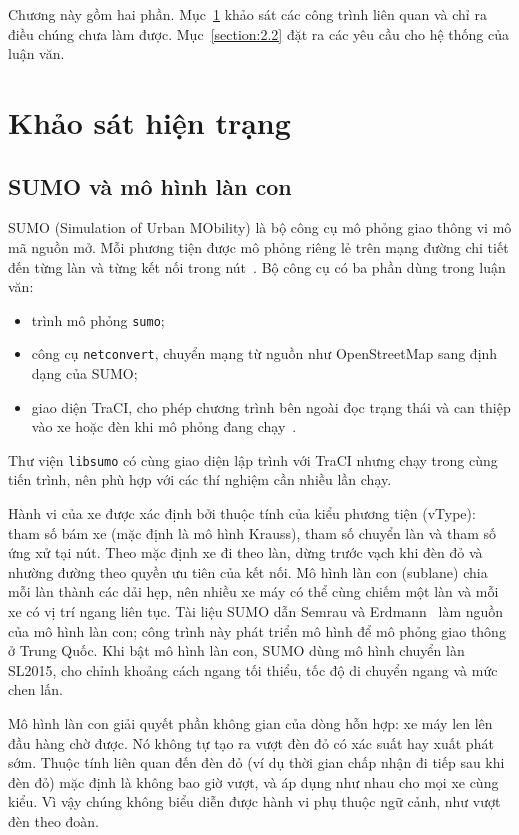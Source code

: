 \documentclass[../DoAn.tex]{subfiles}
\begin{document}
Chương này gồm hai phần. Mục~\ref{section:2.1} khảo sát các công trình liên quan và chỉ ra điều chúng chưa làm được. Mục~\ref{section:2.2} đặt ra các yêu cầu cho hệ thống của luận văn.

\section{Khảo sát hiện trạng}
\label{section:2.1}

\subsection{SUMO và mô hình làn con}
\label{subsection:2.1.1}

SUMO (Simulation of Urban MObility) là bộ công cụ mô phỏng giao thông vi mô mã nguồn mở. Mỗi phương tiện được mô phỏng riêng lẻ trên mạng đường chi tiết đến từng làn và từng kết nối trong nút~\cite{lopez2018sumo}. Bộ công cụ có ba phần dùng trong luận văn:
\begin{itemize}
    \item trình mô phỏng \texttt{sumo};
    \item công cụ \texttt{netconvert}, chuyển mạng từ nguồn như OpenStreetMap sang định dạng của SUMO;
    \item giao diện TraCI, cho phép chương trình bên ngoài đọc trạng thái và can thiệp vào xe hoặc đèn khi mô phỏng đang chạy~\cite{lopez2018sumo}.
\end{itemize}
Thư viện \texttt{libsumo} có cùng giao diện lập trình với TraCI nhưng chạy trong cùng tiến trình, nên phù hợp với các thí nghiệm cần nhiều lần chạy.

Hành vi của xe được xác định bởi thuộc tính của kiểu phương tiện (vType): tham số bám xe (mặc định là mô hình Krauss), tham số chuyển làn và tham số ứng xử tại nút. Theo mặc định xe đi theo làn, dừng trước vạch khi đèn đỏ và nhường đường theo quyền ưu tiên của kết nối. Mô hình làn con (sublane) chia mỗi làn thành các dải hẹp, nên nhiều xe máy có thể cùng chiếm một làn và mỗi xe có vị trí ngang liên tục. Tài liệu SUMO dẫn Semrau và Erdmann~\cite{semrau2016chinese} làm nguồn của mô hình làn con; công trình này phát triển mô hình để mô phỏng giao thông ở Trung Quốc. Khi bật mô hình làn con, SUMO dùng mô hình chuyển làn SL2015, cho chỉnh khoảng cách ngang tối thiểu, tốc độ di chuyển ngang và mức chen lấn.

Mô hình làn con giải quyết phần không gian của dòng hỗn hợp: xe máy len lên đầu hàng chờ được. Nó không tự tạo ra vượt đèn đỏ có xác suất hay xuất phát sớm. Thuộc tính liên quan đến đèn đỏ (ví dụ thời gian chấp nhận đi tiếp sau khi đèn đỏ) mặc định là không bao giờ vượt, và áp dụng như nhau cho mọi xe cùng kiểu. Vì vậy chúng không biểu diễn được hành vi phụ thuộc ngữ cảnh, như vượt đèn theo đoàn.
\end{document}
